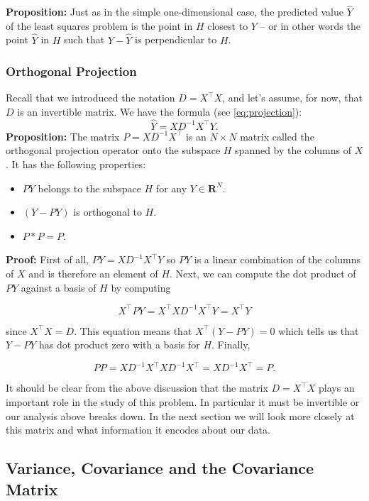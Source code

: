 \documentclass[
]{article}
\providecommand{\tightlist}{%
  \setlength{\itemsep}{0pt}\setlength{\parskip}{0pt}}
\begin{document}
\textbf{Proposition:} Just as in the simple one-dimensional case, the
predicted value \(\hat{Y}\) of the least squares problem is the point in
\(H\) closest to \(Y\) -- or in other words the point \(\hat{Y}\) in
\(H\) such that \(Y-\hat{Y}\) is perpendicular to \(H\).

\hypertarget{orthogonal-projection}{%
\subsubsection{Orthogonal Projection}\label{orthogonal-projection}}

Recall that we introduced the notation \(D=X^{\intercal}X\), and let's
assume, for now, that \(D\) is an invertible matrix. We have the formula
(see \cref{eq:projection}): \[
\hat{Y} = XD^{-1}X^{\intercal}Y.
\] \textbf{Proposition:} The matrix \(P=XD^{-1}X^{\intercal}\) is an
\(N\times N\) matrix called the orthogonal projection operator onto the
subspace \(H\) spanned by the columns of \(X\). It has the following
properties:

\begin{itemize}
\tightlist
\item
  \(PY\) belongs to the subspace \(H\) for any \(Y\in\mathbf{R}^{N}\).
\item
  \((Y-PY)\) is orthogonal to \(H\).
\item
  \(P*P = P\).
\end{itemize}

\textbf{Proof:} First of all, \(PY=XD^{-1}X^{\intercal}Y\) so \(PY\) is
a linear combination of the columns of \(X\) and is therefore an element
of \(H\). Next, we can compute the dot product of \(PY\) against a basis
of \(H\) by computing

\[
X^{\intercal}PY = X^{\intercal}XD^{-1}X^{\intercal}Y = X^{\intercal}Y
\]

since \(X^{\intercal}X=D\). This equation means that
\(X^{\intercal}(Y-PY)=0\) which tells us that \(Y-PY\) has dot product
zero with a basis for \(H\). Finally,

\[
PP = XD^{-1}X^{\intercal}XD^{-1}X^{\intercal} = XD^{-1}X^{\intercal}=P.
\]

It should be clear from the above discussion that the matrix
\(D=X^{\intercal}X\) plays an important role in the study of this
problem. In particular it must be invertible or our analysis above
breaks down. In the next section we will look more closely at this
matrix and what information it encodes about our data.

\hypertarget{sec:variance}{%
\subsection{Variance, Covariance and the Covariance
Matrix}\label{sec:variance}}
\end{document}
